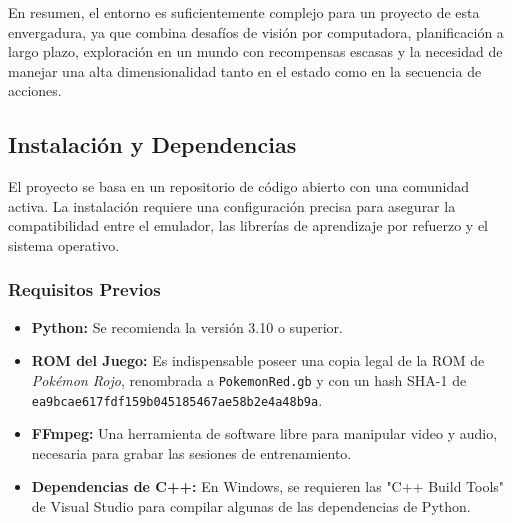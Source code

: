 \documentclass[12pt, oneside, openany]{book}
\begin{document}
En resumen, el entorno es suficientemente complejo para un proyecto de esta envergadura, ya que combina desafíos de visión por computadora, planificación a largo plazo, exploración en un mundo con recompensas escasas y la necesidad de manejar una alta dimensionalidad tanto en el estado como en la secuencia de acciones.

\subsection{Instalación y Dependencias}
El proyecto se basa en un repositorio de código abierto con una comunidad activa. La instalación requiere una configuración precisa para asegurar la compatibilidad entre el emulador, las librerías de aprendizaje por refuerzo y el sistema operativo.

\subsubsection{Requisitos Previos}
\begin{itemize}
    \item \textbf{Python:} Se recomienda la versión 3.10 o superior.
    \item \textbf{ROM del Juego:} Es indispensable poseer una copia legal de la ROM de \textit{Pokémon Rojo}, renombrada a \texttt{PokemonRed.gb} y con un hash SHA-1 de \texttt{ea9bcae617fdf159b045185467ae58b2e4a48b9a}.
    \item \textbf{FFmpeg:} Una herramienta de software libre para manipular video y audio, necesaria para grabar las sesiones de entrenamiento.
    \item \textbf{Dependencias de C++:} En Windows, se requieren las "C++ Build Tools" de Visual Studio para compilar algunas de las dependencias de Python.
\end{itemize}
\end{document}
